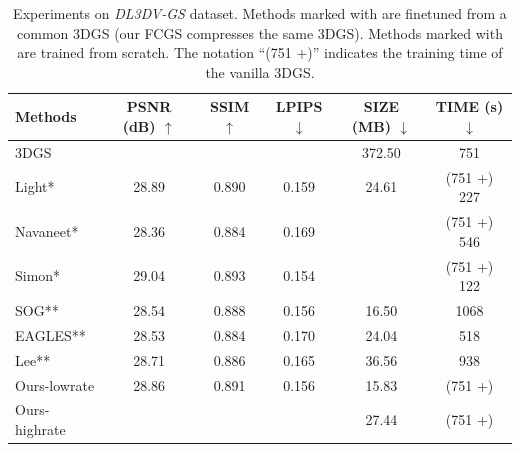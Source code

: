 \documentclass{article} %
\begin{document}
\begin{table}[h]
    \centering
    \caption{Experiments on \textit{DL3DV-GS} dataset. Methods marked with \text{*} are finetuned from a common 3DGS (our FCGS compresses the same 3DGS). Methods marked with \text{**} are trained from scratch. The notation ``(751 +)'' indicates the training time of the vanilla 3DGS. }
    \vspace{10pt}
    \begin{tabular}{lccccc}
        \toprule[2pt]
        \multicolumn{1}{l|}{Methods}        & PSNR (dB) $\uparrow$ & SSIM $\uparrow$ & \multicolumn{1}{c|}{LPIPS $\downarrow$} & \multicolumn{1}{c|}{SIZE (MB) $\downarrow$} & TIME (s) $\downarrow$ \\ \bottomrule
        \multicolumn{1}{l|}{3DGS} & \cellcolor{red!25}{29.34}     & \cellcolor{red!25}{0.898} & \multicolumn{1}{c|}{\cellcolor{red!25}{0.146}} & \multicolumn{1}{c|}{372.50}    & 751      \\ \hline
        \multicolumn{1}{l|}{Light*}         & 28.89     & 0.890 & \multicolumn{1}{c|}{0.159} & \multicolumn{1}{c|}{24.61}     & (751 +) 227      \\
        \multicolumn{1}{l|}{Navaneet*}      & 28.36     & 0.884 & \multicolumn{1}{c|}{0.169} & \multicolumn{1}{c|}{\cellcolor{red!25}{13.60}}     & (751 +) 546      \\
        \multicolumn{1}{l|}{Simon*}         & 29.04     & 0.893 & \multicolumn{1}{c|}{0.154} & \multicolumn{1}{c|}{\cellcolor{yellow!25}{15.36}}     & (751 +) 122      \\ \hline
        \multicolumn{1}{l|}{SOG**}          & 28.54     & 0.888 & \multicolumn{1}{c|}{0.156} & \multicolumn{1}{c|}{16.50}     & 1068     \\
        \multicolumn{1}{l|}{EAGLES**}       & 28.53     & 0.884 & \multicolumn{1}{c|}{0.170} & \multicolumn{1}{c|}{24.04}     & 518      \\
        \multicolumn{1}{l|}{Lee**}          & 28.71     & 0.886 & \multicolumn{1}{c|}{0.165} & \multicolumn{1}{c|}{36.56}     & 938      \\
        \hline
        \multicolumn{1}{l|}{Ours-lowrate}       & 28.86     & 0.891 & \multicolumn{1}{c|}{0.156} & \multicolumn{1}{c|}{15.83}     & (751 +) \cellcolor{red!25}{9 / 16}         \\
        \multicolumn{1}{l|}{Ours-highrate}      & \cellcolor{yellow!25}{29.26}     & \cellcolor{yellow!25}{0.897} & \multicolumn{1}{c|}{\cellcolor{yellow!25}{0.148}} & \multicolumn{1}{c|}{27.44}     &  (751 +) \cellcolor{yellow!25}{11 / 20}        \\ \bottomrule[2pt]
    \end{tabular}
    \label{tab:experiments_DL3DV}
\end{table}
\end{document}
